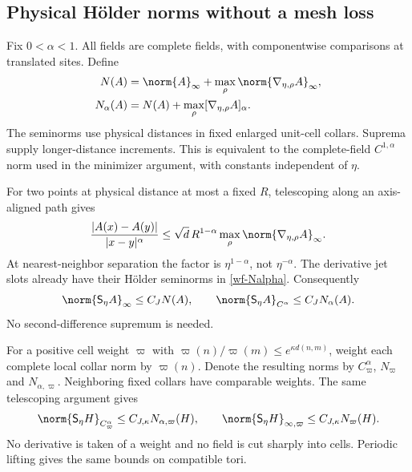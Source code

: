 \subsection{Physical H\"older norms without a mesh loss}

Fix $0<\alpha<1$. All fields are complete fields, with
componentwise comparisons at translated sites. Define
\begin{equation}\label{wf-Nalpha}
 \begin{split}
 N(A)&=\norm{A}_\infty+
                  \max_\rho\norm{\nabla_{\eta,\rho}A}_\infty,\\
 N_\alpha(A)&=N(A)+
                  \max_\rho[\nabla_{\eta,\rho}A]_\alpha.
 \end{split}
\end{equation}
The seminorms use physical distances in fixed enlarged
unit-cell collars. Suprema supply longer-distance
increments. This is equivalent to the complete-field
$C^{1,\alpha}$ norm used in the minimizer argument, with
constants independent of $\eta$.

For two points at physical distance at most a fixed $R$,
telescoping along an axis-aligned path gives
\begin{equation}\label{wf-holder-telescoping}
 \frac{|A(x)-A(y)|}{|x-y|^\alpha}
 \le\sqrt d\,R^{1-\alpha}
                      \max_\rho\norm{\nabla_{\eta,\rho}A}_\infty.
\end{equation}
At nearest-neighbor separation the factor is
$\eta^{1-\alpha}$, not $\eta^{-\alpha}$. The derivative
jet slots already have their H\"older seminorms in
\eqref{wf-Nalpha}. Consequently
\begin{equation}\label{wf-jet-norm}
 \norm{\mathsf S_\eta A}_\infty\le C_JN(A),\qquad
 \norm{\mathsf S_\eta A}_{C^\alpha}\le C_JN_\alpha(A).
\end{equation}
No second-difference supremum is needed.

For a positive cell weight $\varpi$ with
$\varpi(n)/\varpi(m)\le e^{\kappa d(n,m)}$, weight each
complete local collar norm by $\varpi(n)$. Denote the
resulting norms by $C^\alpha_\varpi$, $N_\varpi$ and
$N_{\alpha,\varpi}$. Neighboring fixed collars have
comparable weights. The same telescoping argument gives
\begin{equation}\label{wf-weighted-jet}
 \norm{\mathsf S_\eta H}_{C^\alpha_\varpi}
       \le C_{J,\kappa}N_{\alpha,\varpi}(H),\qquad
 \norm{\mathsf S_\eta H}_{\infty,\varpi}
       \le C_{J,\kappa}N_\varpi(H).
\end{equation}
No derivative is taken of a weight and no field is cut
sharply into cells. Periodic lifting gives the same bounds
on compatible tori.

